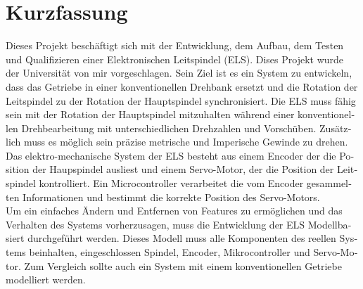 \chapter*{Kurzfassung}
\label{kurzfassung}
\begin{otherlanguage}{ngerman}

Dieses Projekt beschäftigt sich mit der Entwicklung, dem Aufbau, dem Testen und Qualifizieren einer Elektronischen Leitspindel (ELS). Dises Projekt wurde der Universität von mir vorgeschlagen.
Sein Ziel ist es ein System zu entwickeln, dass das Getriebe in einer konventionellen Drehbank ersetzt und die Rotation der Leitspindel zu der Rotation der Hauptspindel synchronisiert. Die ELS muss
fähig sein mit der Rotation der Hauptspindel mitzuhalten während einer konventionellen Drehbearbeitung mit unterschiedlichen Drehzahlen und Vorschüben. Zusätzlich muss es möglich sein präzise metrische und
Imperische Gewinde zu drehen.\\

Das elektro-mechanische System der ELS besteht aus einem Encoder der die Position der Haupspindel ausliest und einem Servo-Motor, der die Position der Leitspindel kontrolliert. Ein Microcontroller
verarbeitet die vom Encoder gesammelten Informationen und bestimmt die korrekte Position des Servo-Motors.\\

Um ein einfaches Ändern und Entfernen von Features zu ermöglichen und das Verhalten des Systems vorherzusagen, muss die Entwicklung der ELS Modellbasiert durchgeführt werden. Dieses Modell muss alle
Komponenten des reellen Systems beinhalten, eingeschlossen Spindel, Encoder, Mikrocontroller und Servo-Motor. Zum Vergleich sollte auch ein System mit einem konventionellen Getriebe modelliert werden.

\end{otherlanguage}
